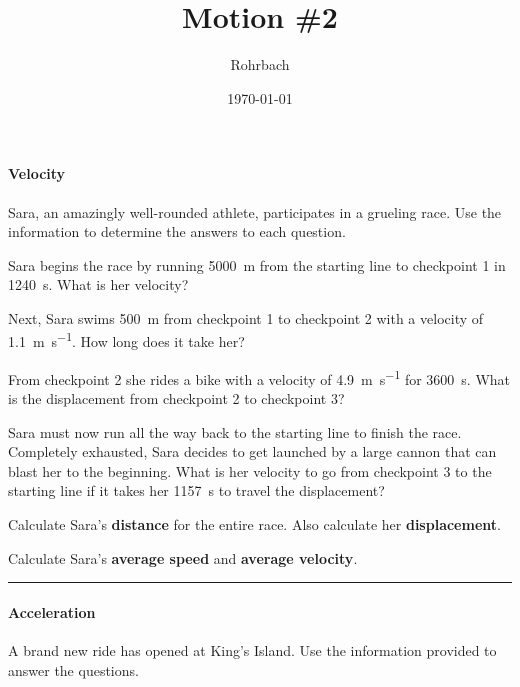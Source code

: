 \documentclass[10pt]{exam}
\title{Motion \#2}
\author{Rohrbach}
\date{\today}
\begin{document}
\maketitle

\vspace{-2em}
\begin{questions}

  \begin{EnvUplevel}
    \paragraph{Velocity}
      Sara, an amazingly well-rounded athlete, participates in a grueling race.  Use the information to determine the answers to each question.
  \end{EnvUplevel}

  \question 
    Sara begins the race by running \SI{5000}{\meter} from the starting line to checkpoint 1 in \SI{1240}{\second}.  What is her velocity?
    \vs

  \question
    Next, Sara swims \SI{500}{\meter} from checkpoint 1 to checkpoint 2 with a velocity of \SI{1.1}{\meter\per\second}.  How long does it take her?
    \vs

  \question
    From checkpoint 2 she rides a bike with a velocity of \SI{4.9}{\meter\per\second} for \SI{3600}{\second}.  What is the displacement from checkpoint 2 to checkpoint 3?
    \vs 
  
  \question
    Sara must now run all the way back to the starting line to finish the race.  Completely exhausted, Sara decides to get launched by a large cannon that can blast her to the beginning.  What is her velocity to go from checkpoint 3 to the starting line if it takes her \SI{1157}{\second} to travel the displacement?
    \vs

  \pagebreak

  \question
    Calculate Sara's {\bf distance} for the entire race.  Also calculate her {\bf displacement}.
    \vs

  \question
    Calculate Sara's {\bf average speed} and {\bf average velocity}.
    \vs

    \begin{EnvUplevel}
      \hrule
      \paragraph{Acceleration}
        A brand new ride has opened at King's Island.  Use the information provided to answer the questions.
    \end{EnvUplevel}


\end{questions}
\end{document}
